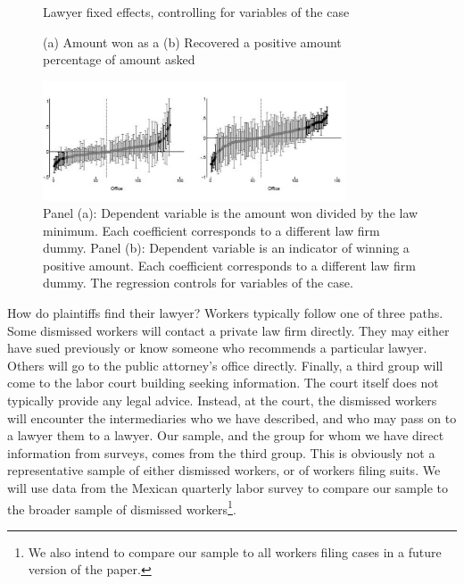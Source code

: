 \documentclass[12 pt]{article}
\begin{document}
\begin{figure}[!htbp] %
    \centering
    \caption{Lawyer fixed effects, controlling for variables of the case}
    \captionsetup{singlelinecheck = false}
    \caption*{\qquad \qquad (a)	Amount won as a	\qquad \qquad \qquad (b) Recovered a positive amount\\
    \phantom{)}\hspace{1.5cm} percentage of amount asked}
    \includegraphics[width=0.8\textwidth]{Figures/Figure1.png}
    
    \caption*{Panel (a): Dependent variable is the amount won divided by the law minimum. Each coefficient corresponds to a different law firm dummy. Panel (b): Dependent variable is an indicator of winning a positive amount. Each coefficient corresponds to a different law firm dummy. The regression controls for variables of the case.}
    \label{fig:1}
\end{figure}

How do plaintiffs find their lawyer? Workers typically follow one of three paths. Some dismissed workers will contact a private law firm directly. They may either have sued previously or know someone who recommends a particular lawyer. Others will go to the public attorney’s office directly. Finally, a third group will come to the labor court building seeking information. The court itself does not typically provide any legal advice. Instead, at the court, the dismissed workers will encounter the intermediaries who we have described, and who may pass on to a lawyer them to a lawyer. Our sample, and the group for whom we have direct information from surveys, comes from the third group. This is obviously not a representative sample of either dismissed workers, or of workers filing suits. We will use data from the Mexican quarterly labor survey to compare our sample to the broader sample of dismissed workers\footnote{We also intend to compare our sample to all workers filing cases in a future version of the paper.}.
\end{document}
